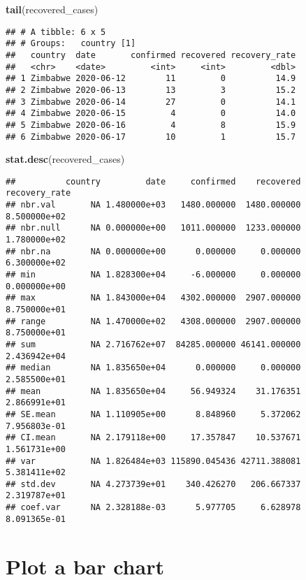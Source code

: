 \documentclass[
]{article}
\newenvironment{Shaded}{\begin{snugshade}}{\end{snugshade}}
\newcommand{\KeywordTok}[1]{\textcolor[rgb]{0.13,0.29,0.53}{\textbf{#1}}}
\newcommand{\NormalTok}[1]{#1}
\begin{document}
\begin{Shaded}
\begin{Highlighting}[]
\KeywordTok{tail}\NormalTok{(recovered_cases)}
\end{Highlighting}
\end{Shaded}

\begin{verbatim}
## # A tibble: 6 x 5
## # Groups:   country [1]
##   country  date       confirmed recovered recovery_rate
##   <chr>    <date>         <int>     <int>         <dbl>
## 1 Zimbabwe 2020-06-12        11         0          14.9
## 2 Zimbabwe 2020-06-13        13         3          15.2
## 3 Zimbabwe 2020-06-14        27         0          14.1
## 4 Zimbabwe 2020-06-15         4         0          14.0
## 5 Zimbabwe 2020-06-16         4         8          15.9
## 6 Zimbabwe 2020-06-17        10         1          15.7
\end{verbatim}

\begin{Shaded}
\begin{Highlighting}[]
\KeywordTok{stat.desc}\NormalTok{(recovered_cases)}
\end{Highlighting}
\end{Shaded}

\begin{verbatim}
##          country         date     confirmed    recovered recovery_rate
## nbr.val       NA 1.480000e+03   1480.000000  1480.000000  8.500000e+02
## nbr.null      NA 0.000000e+00   1011.000000  1233.000000  1.780000e+02
## nbr.na        NA 0.000000e+00      0.000000     0.000000  6.300000e+02
## min           NA 1.828300e+04     -6.000000     0.000000  0.000000e+00
## max           NA 1.843000e+04   4302.000000  2907.000000  8.750000e+01
## range         NA 1.470000e+02   4308.000000  2907.000000  8.750000e+01
## sum           NA 2.716762e+07  84285.000000 46141.000000  2.436942e+04
## median        NA 1.835650e+04      0.000000     0.000000  2.585500e+01
## mean          NA 1.835650e+04     56.949324    31.176351  2.866991e+01
## SE.mean       NA 1.110905e+00      8.848960     5.372062  7.956803e-01
## CI.mean       NA 2.179118e+00     17.357847    10.537671  1.561731e+00
## var           NA 1.826484e+03 115890.045436 42711.388081  5.381411e+02
## std.dev       NA 4.273739e+01    340.426270   206.667337  2.319787e+01
## coef.var      NA 2.328188e-03      5.977705     6.628978  8.091365e-01
\end{verbatim}

\hypertarget{plot-a-bar-chart}{%
\section{Plot a bar chart}\label{plot-a-bar-chart}}
\end{document}
